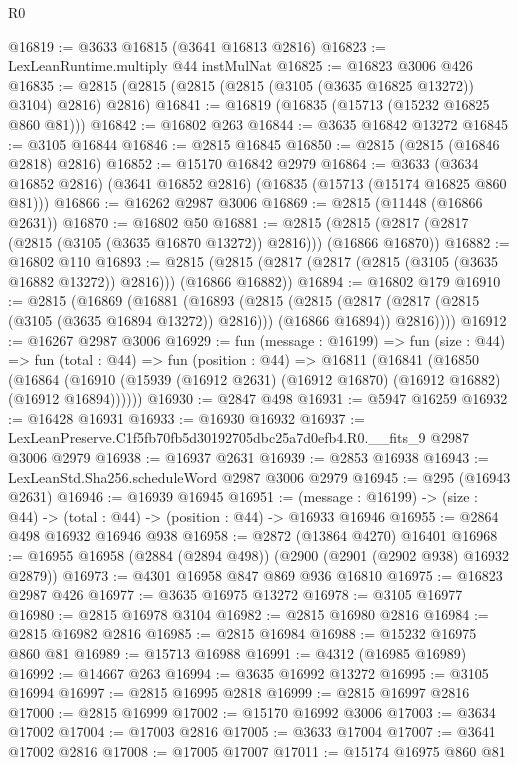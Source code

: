 \begin{lexlean}{R0}
\begin{coremodule}
@16819 := @3633 @16815 (@3641 @16813 @2816)
@16823 := LexLeanRuntime.multiply @44 instMulNat
@16825 := @16823 @3006 @426
@16835 := @2815 (@2815 (@2815 (@2815 (@3105 (@3635 @16825 @13272)) @3104) @2816) @2816)
@16841 := @16819 (@16835 (@15713 (@15232 @16825 @860 @81)))
@16842 := @16802 @263
@16844 := @3635 @16842 @13272
@16845 := @3105 @16844
@16846 := @2815 @16845
@16850 := @2815 (@2815 (@16846 @2818) @2816)
@16852 := @15170 @16842 @2979
@16864 := @3633 (@3634 @16852 @2816) (@3641 @16852 @2816) (@16835 (@15713 (@15174 @16825 @860 @81)))
@16866 := @16262 @2987 @3006
@16869 := @2815 (@11448 (@16866 @2631))
@16870 := @16802 @50
@16881 := @2815 (@2815 (@2817 (@2817 (@2815 (@3105 (@3635 @16870 @13272)) @2816))) (@16866 @16870))
@16882 := @16802 @110
@16893 := @2815 (@2815 (@2817 (@2817 (@2815 (@3105 (@3635 @16882 @13272)) @2816))) (@16866 @16882))
@16894 := @16802 @179
@16910 := @2815
    (@16869
      (@16881
        (@16893
          (@2815
            (@2815 (@2817 (@2817 (@2815 (@3105 (@3635 @16894 @13272)) @2816))) (@16866 @16894))
            @2816))))
@16912 := @16267 @2987 @3006
@16929 := fun (message : @16199) =>
  fun (size : @44) =>
  fun (total : @44) =>
  fun (position : @44) =>
  @16811
    (@16841
      (@16850
        (@16864 (@16910 (@15939 (@16912 @2631) (@16912 @16870) (@16912 @16882) (@16912 @16894))))))
@16930 := @2847 @498
@16931 := @5947 @16259
@16932 := @16428 @16931
@16933 := @16930 @16932
@16937 := LexLeanPreserve.C1f5fb70fb5d30192705dbc25a7d0efb4.R0.__fits_9 @2987 @3006 @2979
@16938 := @16937 @2631
@16939 := @2853 @16938
@16943 := LexLeanStd.Sha256.scheduleWord @2987 @3006 @2979
@16945 := @295 (@16943 @2631)
@16946 := @16939 @16945
@16951 := (message : @16199) -> (size : @44) -> (total : @44) -> (position : @44) -> @16933 @16946
@16955 := @2864 @498 @16932 @16946 @938
@16958 := @2872 (@13864 @4270) @16401
@16968 := @16955 @16958 (@2884 (@2894 @498)) (@2900 (@2901 (@2902 @938) @16932 @2879))
@16973 := @4301 @16958 @847 @869 @936 @16810
@16975 := @16823 @2987 @426
@16977 := @3635 @16975 @13272
@16978 := @3105 @16977
@16980 := @2815 @16978 @3104
@16982 := @2815 @16980 @2816
@16984 := @2815 @16982 @2816
@16985 := @2815 @16984
@16988 := @15232 @16975 @860 @81
@16989 := @15713 @16988
@16991 := @4312 (@16985 @16989)
@16992 := @14667 @263
@16994 := @3635 @16992 @13272
@16995 := @3105 @16994
@16997 := @2815 @16995 @2818
@16999 := @2815 @16997 @2816
@17000 := @2815 @16999
@17002 := @15170 @16992 @3006
@17003 := @3634 @17002
@17004 := @17003 @2816
@17005 := @3633 @17004
@17007 := @3641 @17002 @2816
@17008 := @17005 @17007
@17011 := @15174 @16975 @860 @81

\end{coremodule}
\end{lexlean}
